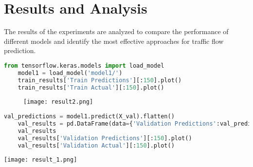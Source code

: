 \section{Results and Analysis}

The results of the experiments are analyzed to compare the performance of different models and identify the most effective approaches for traffic flow prediction.

\begin{lstlisting}[language=Python,caption={Performance Metrics},label={code:data}]
    from tensorflow.keras.models import load_model
    model1 = load_model('model1/')
    train_results['Train Predictions'][:150].plot()
    train_results['Train Actual'][:150].plot()
\end{lstlisting}



\begin{figure}[h!]
    \centering
    \texttt{[image: result2.png]}
\end{figure}


\begin{lstlisting}[language=Python,caption={Performance Metrics},label={code:data}]
    val_predictions = model1.predict(X_val).flatten()
    val_results = pd.DataFrame(data={'Validation Predictions':val_predictions, 'Validation Actual':y_val})
    val_results
    val_results['Validation Predictions'][:150].plot()
    val_results['Validation Actual'][:150].plot()
\end{lstlisting}

\texttt{[image: result\_1.png]}
